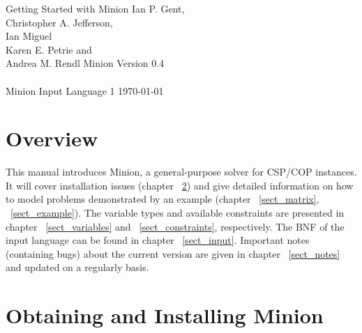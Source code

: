 \documentclass{article}
\begin{document}

\newpage

\pagestyle{empty}
\begin{center}
\vfill
{\LARGE Getting Started with {\sc Minion}}
\vfill
{\large Ian P. Gent,\\
Christopher A. Jefferson,\\
Ian Miguel\\
Karen E. Petrie and\\
Andrea M. Rendl}
\vfill
{\Large {\sc Minion} Version 0.4}\\
~\\
{\Large {\sc Minion} Input Language 1}
\vfill
{\large{\today}}
\vfill
\end{center}

\newpage

\pagestyle{empty}
\setcounter{page}{1}
\pagestyle{plain}

\tableofcontents

\newpage
\setcounter{page}{1}
\pagestyle{headings}


\section{Overview}\label{sect_introduction}
This manual introduces {\sc Minion}, a general-purpose solver for CSP/COP instances. 
It will cover installation issues (chapter ~\ref{sect_installation})  and give detailed information on how to model problems demonstrated by an example (chapter  ~\ref{sect_matrix}, ~\ref{sect_example}). The variable types and available
constraints are presented in chapter ~\ref{sect_variables} and ~\ref{sect_constraints}, respectively. The BNF of the input language can be found in chapter ~\ref{sect_input}. Important notes (containing bugs) about the current version are given in chapter ~\ref{sect_notes} and updated on a regularly basis. 

\section{Obtaining and Installing {\sc Minion}}\label{sect_installation}
\end{document}
